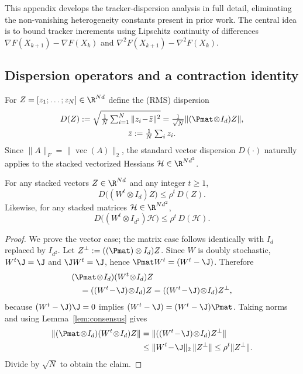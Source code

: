 \documentclass[review,onefignum,onetabnum]{siamart171218}
\begin{document}
	This appendix develops the tracker-dispersion analysis in full detail,
	eliminating the non-vanishing heterogeneity constants present in prior
	work.
	The central idea is to bound tracker increments using Lipschitz
	continuity of differences
	$\nabla F(X_{k+1})-\nabla F(X_k)$ and
	$\nabla^2F(X_{k+1})-\nabla^2F(X_k)$.
	
	\subsection{Dispersion operators and a contraction identity}
	
	For $Z=[z_1;\dots;z_N]\in\R^{Nd}$ define the (RMS) dispersion
	\begin{gather*}
		D(Z):=\sqrt{\tfrac1N\textstyle\sum_{i=1}^N\|z_i\!-\!\bar z\|^2}
		=\tfrac{1}{\sqrt N}\|(\Pmat\!\otimes\! I_d)Z\|,\\
		\bar z:=\tfrac1N\textstyle\sum_i z_i.
	\end{gather*}
	Since $\|A\|_F = \|\operatorname{vec}(A)\|_2$, the standard vector dispersion $D(\cdot)$ naturally applies to the stacked vectorized Hessians $\mathcal{H} \in \R^{Nd^2}$.
	
	\begin{lemma}\label{lem:mix_contract}
		For any stacked vectors $Z\in\R^{Nd}$ and any integer $t\ge1$,
		\[
		D\big((W^t\otimes I_d)Z\big)\le \rho^t\,D(Z).
		\]
		Likewise, for any stacked matrices $\mathcal H\in\R^{Nd^2}$,
		\[
		D\big((W^t\otimes I_{d^2})\mathcal H\big)\le \rho^t\,D(\mathcal H).
		\]
	\end{lemma}
	\begin{proof}
		We prove the vector case; the matrix case follows identically with $I_d$ replaced by $I_{d^2}$.
		Let $Z^\perp:=((\Pmat)\otimes I_d)Z$. Since $W$ is doubly stochastic, $W^t\J=\J$ and $\J W^t=\J$, hence
		$\Pmat W^t=(W^t-\J)$. Therefore
		\begin{align*}
			&(\Pmat\!\otimes\! I_d)(W^t\!\otimes\! I_d)Z\\
			&\quad=((W^t\!-\!\J)\!\otimes\! I_d)Z=((W^t\!-\!\J)\!\otimes\! I_d)Z^\perp,
		\end{align*}
		because $(W^t-\J)\J=0$ implies $(W^t-\J)=(W^t-\J)\Pmat$.
		Taking norms and using Lemma~\ref{lem:consensus} gives
		\begin{align*}
			\|(\Pmat\!\otimes\! I_d)(W^t\!\otimes\! I_d)Z\|
			&=\|((W^t\!-\!\J)\!\otimes\! I_d)Z^\perp\|\\
			&\le \|W^t\!-\!\J\|_2\,\|Z^\perp\|
			\le \rho^t\|Z^\perp\|.
		\end{align*}
		Divide by $\sqrt N$ to obtain the claim.
	\end{proof}
	
\end{document}
